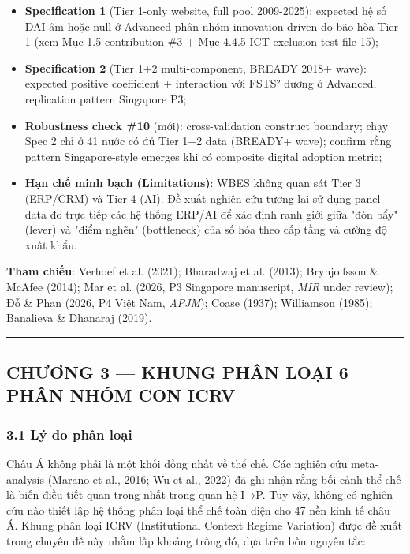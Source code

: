 \documentclass[12pt,a4paper]{article}
\providecommand{\tightlist}{\setlength{\itemsep}{0pt}\setlength{\parskip}{0pt}}
\begin{document}
\begin{itemize}
\tightlist
\item
  \textbf{Specification 1} (Tier 1-only website, full pool 2009-2025):
  expected hệ số DAI âm hoặc null ở Advanced phân nhóm innovation-driven
  do bão hòa Tier 1 (xem Mục 1.5 contribution \#3 + Mục 4.4.5 ICT
  exclusion test file 15);
\item
  \textbf{Specification 2} (Tier 1+2 multi-component, BREADY 2018+
  wave): expected positive coefficient + interaction với FSTS² dương ở
  Advanced, replication pattern Singapore P3;
\item
  \textbf{Robustness check \#10} (mới): cross-validation construct
  boundary; chạy Spec 2 chỉ ở 41 nước có đủ Tier 1+2 data (BREADY+
  wave); confirm rằng pattern Singapore-style emerges khi có composite
  digital adoption metric;
\item
  \textbf{Hạn chế minh bạch (Limitations)}: WBES không quan sát Tier 3
  (ERP/CRM) và Tier 4 (AI). Đề xuất nghiên cứu tương lai sử dụng panel
  data đo trực tiếp các hệ thống ERP/AI để xác định ranh giới giữa "đòn
  bẩy" (lever) và "điểm nghẽn" (bottleneck) của số hóa theo cấp tầng và
  cường độ xuất khẩu.
\end{itemize}

\textbf{Tham chiếu}: Verhoef et al. (2021); Bharadwaj et al. (2013);
Brynjolfsson \& McAfee (2014); Mar et al. (2026, P3 Singapore
manuscript, \emph{MIR} under review); Đỗ \& Phan (2026, P4 Việt Nam,
\emph{APJM}); Coase (1937); Williamson (1985); Banalieva \& Dhanaraj
(2019).

\begin{center}\rule{0.5\linewidth}{0.5pt}\end{center}

\hypertarget{chux1b0ux1a1ng-3--khung-phuxe2n-loux1ea1i-6-phuxe2n-nhuxf3m-con-icrv}{%
\subsection{CHƯƠNG 3 --- KHUNG PHÂN LOẠI 6 PHÂN NHÓM CON
ICRV}\label{chux1b0ux1a1ng-3--khung-phuxe2n-loux1ea1i-6-phuxe2n-nhuxf3m-con-icrv}}

\hypertarget{31-luxfd-do-phuxe2n-loux1ea1i}{%
\subsubsection{3.1 Lý do phân
loại}\label{31-luxfd-do-phuxe2n-loux1ea1i}}

Châu Á không phải là một khối đồng nhất về thể chế. Các nghiên cứu
meta-analysis (Marano et al., 2016; Wu et al., 2022) đã ghi nhận rằng
bối cảnh thể chế là biến điều tiết quan trọng nhất trong quan hệ I→P.
Tuy vậy, không có nghiên cứu nào thiết lập hệ thống phân loại thể chế
toàn diện cho 47 nền kinh tế châu Á. Khung phân loại ICRV (Institutional
Context Regime Variation) được đề xuất trong chuyên đề này nhằm lấp
khoảng trống đó, dựa trên bốn nguyên tắc:
\end{document}
